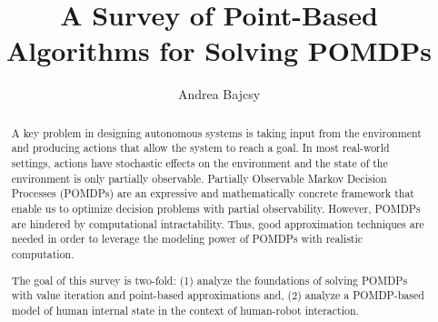 \documentclass[12pt]{elsarticle}
\begin{document}
\begin{frontmatter}


\title{A Survey of Point-Based Algorithms for Solving POMDPs}




\author{Andrea Bajcsy}


\begin{abstract}
A key problem in designing autonomous systems is taking input from the environment and producing actions that allow the system to reach a goal. In most real-world settings, actions have stochastic effects on the environment and the state of the environment is only partially observable. Partially Observable Markov Decision Processes (POMDPs) are an expressive and mathematically concrete framework that enable us to optimize decision problems with partial observability. However, POMDPs are hindered by computational intractability. Thus, good approximation techniques are needed in order to leverage the modeling power of POMDPs with realistic computation.

The goal of this survey is two-fold: (1) analyze the foundations of solving POMDPs with value iteration and point-based approximations and, (2) analyze a POMDP-based model of human internal state in the context of human-robot interaction. %
\end{abstract}

\end{frontmatter}
\end{document}
